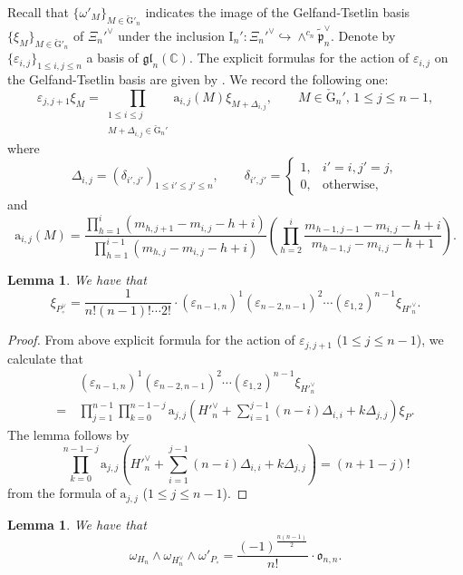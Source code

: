 \documentclass[12pt, a4paper]{amsart}
\newcommand{\RG}{{\mathrm {G}}}
\newcommand{\RI}{{\mathrm {I}}}
\newcommand{\C}{\mathbb{C}}
\newcommand{\M}{\mathbf{M}}
\theoremstyle{Theorem}
\theoremstyle{Theorem}
\theoremstyle{Theorem}
\theoremstyle{Theorem}
\newtheorem{lemp}[prp]{Lemma}
\theoremstyle{Plain}
\theoremstyle{Definition}
\begin{document}
	Recall that $\{\omega'_M\}_{M\in\check{\RG}'_n}$ indicates the image of the Gelfand-Tsetlin basis $\{\xi_M\}_{M\in\check{\RG}'_n}$ of $\Xi_n'^{\vee}$ under the inclusion $\RI_n':\Xi_n'^{\vee}\hookrightarrow\wedge^{c_n}\widetilde{\mathfrak{p}}_n^{\vee}$. Denote by $\{\varepsilon_{i,j}\}_{1\leq i,j\leq n}$ a basis of $\mathfrak{gl}_n(\C)$. The explicit formulas for the action of $\varepsilon_{i,j}$ on the Gelfand-Tsetlin basis are given by \cite[(2,19),(2,20),(2,21)]{IM}. We record the following one:
	\[
	\varepsilon_{j,j+1}\xi_M=\prod_{\substack{1\leq i\leq j\\M+\Delta_{i,j}\in\check{\RG}_n'}}\mathrm{a}_{i,j}(M)\xi_{M+\Delta_{i,j}},\qquad M\in\check{\RG}_n',\, 1\leq j\leq n-1,
	\]
	where
	\[
	\Delta_{i,j}=(\delta_{i',j'})_{1\leq i'\leq j'\leq n},\qquad\delta_{i',j'}=\begin{cases}
		1, & i'=i,j'=j,\\
		0, &\text{otherwise},
	\end{cases}
	\]
	and
	\[
	\mathrm{a}_{i,j}(M)=\frac{\prod_{h=1}^i(m_{h,j+1}-m_{i,j}-h+i)}{\prod_{h=1}^{i-1}(m_{h,j}-m_{i,j}-h+i)}\left(\prod_{h=2}^i\frac{m_{h-1,j-1}-m_{i,j}-h+i}{m_{h-1,j}-m_{i,j}-h+1}\right).
	\]
	
	
	
	\begin{lemp}\label{lemC}
		We have that
		\[
		\xi_{P_{\circ}^{\vee}}=\frac{1}{n!(n-1)!\cdots 2!}\cdot(\varepsilon_{n-1,n})^1(\varepsilon_{n-2,n-1})^2\cdots(\varepsilon_{1,2})^{n-1}\xi_{H'^{\vee}_n}.
		\]
	\end{lemp}
	
	\begin{proof}
		From above explicit formula for the action of $\varepsilon_{j,j+1}$ ($1\leq j\leq n-1$), we calculate that
		\[
		\begin{aligned}
			&\,(\varepsilon_{n-1,n})^1(\varepsilon_{n-2,n-1})^2\cdots(\varepsilon_{1,2})^{n-1}\xi_{H'^{\vee}_n}\\
			=&\,\prod_{j=1}^{n-1}\prod_{k=0}^{n-1-j}\mathrm{a}_{j,j}\left(H'^{\vee}_n+\sum_{i=1}^{j-1}(n-i)\Delta_{i,i}+k\Delta_{j,j}\right)\xi_P.
		\end{aligned}
		\]
		The lemma follows by
		\[
		\prod_{k=0}^{n-1-j}\mathrm{a}_{j,j}\left(H'^{\vee}_n+\sum_{i=1}^{j-1}(n-i)\Delta_{i,i}+k\Delta_{j,j}\right)=(n+1-j)!
		\]
		from the formula of $\mathrm{a}_{j,j}$ ($1\leq j\leq n-1$). 
	\end{proof}
	
	\begin{lemp}\label{lemD}
		We have that
		\[
		\omega_{H_n}\wedge\omega_{H_n^{\vee}}\wedge\omega'_{P_{\circ}}=\frac{(-1)^{\frac{n(n-1)}{2}}}{n!}\cdot\mathfrak{o}_{n,n}.
		\]
	\end{lemp}
	
\end{document}
